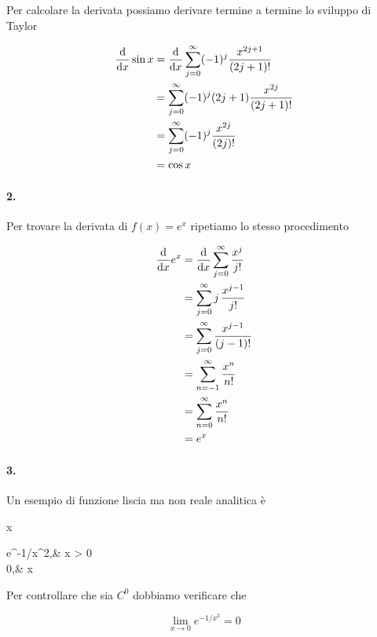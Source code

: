 Per calcolare la derivata possiamo derivare termine a termine lo sviluppo di Taylor

\begin{align}
	\begin{split}
		\dv{x} \sin x &= \dv{x} \sum_{j=0}^{\infty} (-1)^{j} \dfrac{x^{2j+1}}{(2j+1)!}\\
		&= \sum_{j=0}^{\infty} (-1)^{j} (2j+1) \dfrac{x^{2j}}{(2j+1)!}\\
		&= \sum_{j=0}^{\infty} (-1)^{j} \dfrac{x^{2j}}{(2j)!}\\
		&= \cos x
	\end{split}
\end{align}

\paragraph{2.}

Per trovare la derivata di $ f(x) = e^{x} $ ripetiamo lo stesso procedimento

\begin{align}
	\begin{split}
		\dv{x} e^{x} &= \dv{x} \sum_{j=0}^{\infty}\dfrac{x^{j}}{j!}\\
		&= \sum_{j=0}^{\infty} j \, \dfrac{x^{j-1}}{j!}\\
		&= \sum_{j=0}^{\infty} \dfrac{x^{j-1}}{(j-1)!}\\
		&= \sum_{n=-1}^{\infty} \dfrac{x^{n}}{n!}\\
		&= \sum_{n=0}^{\infty} \dfrac{x^{n}}{n!}\\
		&= e^{x}
	\end{split}
\end{align}

\paragraph{3.}

Un esempio di funzione liscia ma non reale analitica è

	{\R}{\R}
	{x}{%
		\begin{cases}
			e^{-1/x^{2}},&  x > 0\\
			0,&  x 
		\end{cases}
		}

Per controllare che sia $ C^{0} $ dobbiamo verificare che

\begin{equation}
	\lim_{x \to 0} e^{-1/x^{2}} = 0
\end{equation}

